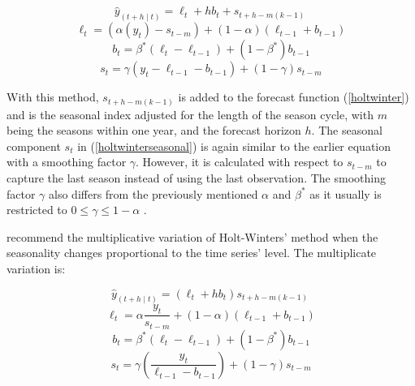 \documentclass[12pt,a4paper]{article}
\begin{document}
\begin{equation}
  {\hat{y}}_{\left(t+h\middle| t\right)}=\ell_t+hb_t+s_{t+h-m\left(k-1\right)}\ 
  \label{holtwinterseasonal}
\end{equation}
\begin{equation}
  \ell_t=(\alpha(y_t)-s_{t-m})+(1 - \alpha)(\ell_{t-1}+b_{t-1})
  \label{levelholtwinterseasonal}
\end{equation}
\begin{equation}
  b_t=\beta^\ast\left(\ell_t-\ell_{t-1}\right)+\left(1-\beta^\ast\right)b_{t-1}
  \label{trendholtwinterseasonal}
\end{equation}
\begin{equation}
  s_t=\gamma\left(y_t-\ell_{t-1}-b_{t-1}\right)+\left(1-\gamma\right)s_{t-m}
  \label{seasonalholtwinterseasonal}
\end{equation}

With this method, $s_{t+h-m\left(k-1\right)}$ is added to the forecast function (\ref{holtwinter}) and is the seasonal index adjusted for the length of the season cycle, with $m$ being the seasons within one year, and the forecast horizon $h$. The seasonal component $s_t$ in (\ref{holtwinterseasonal}) is again similar to the earlier equation with a smoothing factor $\gamma$. However, it is calculated with respect to $s_{t-m}$ to capture the last season instead of using the last observation. The smoothing factor $\gamma$ also differs from the previously mentioned $\alpha$ and $\beta^\ast$ as it usually is restricted to $0\le\gamma\le1-\alpha$ \parencite{HyndmanForecasting2021}.

\cite{HyndmanForecasting2021} recommend the multiplicative variation of Holt-Winters’ method when the seasonality changes proportional to the time series' level. The multiplicate variation is: 

\begin{equation}
  {\hat{y}}_{\left(t+h\middle| t\right)}=\left(\ell_t+hb_t\right)s_{t+h-m\left(k-1\right)}\ 
  \label{holtwinterseasonalmultiplicative}
\end{equation}
\begin{equation}
  \ell_t=\alpha\frac{y_t}{s_{t-m}}+\left(1-\alpha\right)\left(\ell_{t-1}+b_{t-1}\right)
  \label{levelholtwinterseasonalmultiplicative}
\end{equation}
\begin{equation}
  b_t=\beta^\ast\left(\ell_t-\ell_{t-1}\right)+\left(1-\beta^\ast\right)b_{t-1}
  \label{trendholtwinterseasonalmultiplicative}
\end{equation}
\begin{equation}
  s_t=\gamma\left(\frac{y_t}{\ell_{t-1}-b_{t-1}}\right)+\left(1-\gamma\right)s_{t-m}
  \label{seasonalholtwinterseasonalmultiplicative}
\end{equation}
\end{document}
